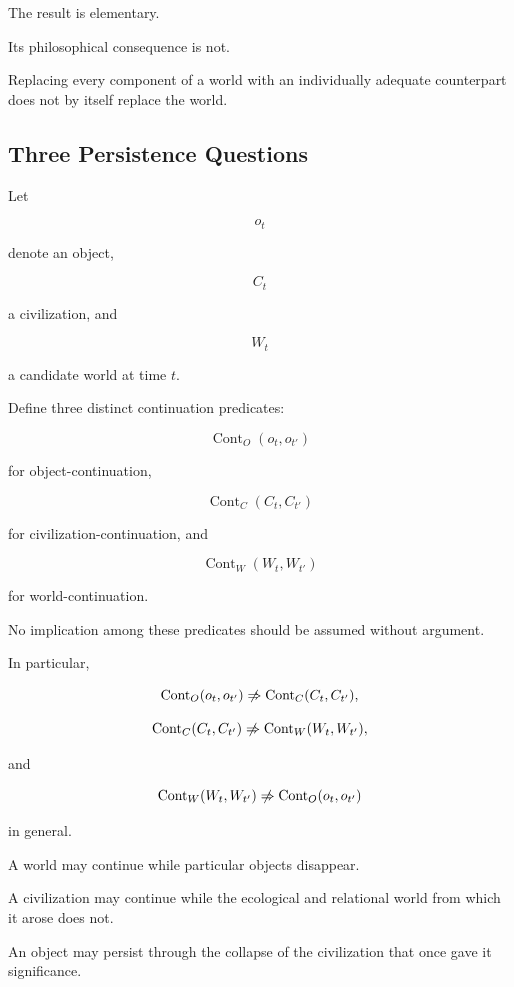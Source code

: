\documentclass[
  11pt,
  a4paper,
  DIV=12,
  BCOR=0mm,
  parskip=half-
]{scrartcl}
\newcommand{\Cont}{\operatorname{Cont}}
\theoremstyle{definition}
\theoremstyle{plain}
\theoremstyle{remark}
\begin{document}
The result is elementary.

Its philosophical consequence is not.

Replacing every component of a world with an individually adequate
counterpart does not by itself replace the world.


\subsection{Three Persistence Questions}
\label{app:three-persistence-questions}

Let

\[
  o_t
\]

denote an object,

\[
  C_t
\]

a civilization, and

\[
  W_t
\]

a candidate world at time \(t\).

Define three distinct continuation predicates:

\[
  \Cont_O(o_t,o_{t'})
\]

for object-continuation,

\[
  \Cont_C(C_t,C_{t'})
\]

for civilization-continuation, and

\[
  \Cont_W(W_t,W_{t'})
\]

for world-continuation.

No implication among these predicates should be assumed without argument.

In particular,

\[
  \Cont_O(o_t,o_{t'})
  \centernot\Rightarrow
  \Cont_C(C_t,C_{t'}),
\]

\[
  \Cont_C(C_t,C_{t'})
  \centernot\Rightarrow
  \Cont_W(W_t,W_{t'}),
\]

and

\[
  \Cont_W(W_t,W_{t'})
  \centernot\Rightarrow
  \Cont_O(o_t,o_{t'})
\]

in general.

A world may continue while particular objects disappear.

A civilization may continue while the ecological and relational world from
which it arose does not.

An object may persist through the collapse of the civilization that once gave
it significance.
\end{document}

